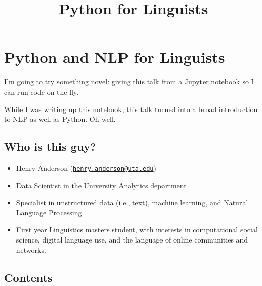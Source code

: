 \documentclass[11pt]{article}
\title{Python for Linguists}
\providecommand{\tightlist}{%
      \setlength{\itemsep}{0pt}\setlength{\parskip}{0pt}}
\begin{document}
    
    
    \maketitle
    \newpage
    \tableofcontents
    \newpage
    
    

    
    \hypertarget{python-and-nlp-for-linguists}{%
\section{Python and NLP for
Linguists}\label{python-and-nlp-for-linguists}}

I'm going to try something novel: giving this talk from a Jupyter
notebook so I can run code on the fly.

While I was writing up this notebook, this talk turned into a broad
introduction to NLP as well as Python. Oh well.

    \hypertarget{who-is-this-guy}{%
\subsection{Who is this guy?}\label{who-is-this-guy}}

\begin{itemize}
\tightlist
\item
  Henry Anderson
  (\href{mailto:henry.anderson@uta.edu}{\nolinkurl{henry.anderson@uta.edu}})
\item
  Data Scientist in the University Analytics department
\item
  Specialist in unstructured data (i.e., text), machine learning, and
  Natural Language Processing
\item
  First year Linguistics masters student, with interests in
  computational social science, digital language use, and the language
  of online communities and networks.
\end{itemize}

    \hypertarget{contents}{%
\subsection{Contents}\label{contents}}
\end{document}
